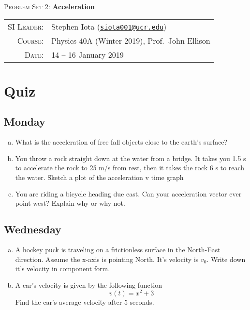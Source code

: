 \documentclass[12pt]{article}
\newcommand{\email}[1]{\texttt{\href{mailto:#1}{#1}}}
\begin{document}
\begin{center}

\Large{\textsc{Problem Set 2}: \textbf{Acceleration}}

\end{center}

\vspace{.5mm}



\begin{tabular}{rl}
\textsc{SI Leader}:
&
Stephen Iota (\email{siota001@ucr.edu})
\\
\textsc{Course}:
&
Physics 40A (Winter 2019), Prof.~John Ellison
\\
\textsc{Date}:
&
14 -- 16 January 2019
\end{tabular}



\section{Quiz}

\subsection{Monday}
\begin{enumerate}[(a)]
	\item What is the acceleration of free fall objects close to the earth's surface?
	\vspace{-1mm}
	\item You throw a rock straight down at the water from a bridge. It takes you 1.5 s to accelerate the rock to 25 m/s from rest, then it takes the rock 6 s to reach the water. Sketch a plot of the acceleration v time graph
	\vspace{-1mm}
	\item You are riding a bicycle heading due east. Can your acceleration vector ever point west? Explain why or why not.
	\vspace{-1mm}
\end{enumerate}


\subsection{Wednesday}

\begin{enumerate}[(a)]
	\item A hockey puck is traveling on a frictionless surface in the North-East direction. Assume the x-axis is pointing North. It's velocity is $v_0$. Write down it's velocity in component form.
	\vspace{-1mm}
	\item A car's velocity is given by the following function
	 		$$ v(t) = x^2 + 3 $$
          Find the car's average velocity after 5 seconds.  
          
\end{enumerate}
\end{document}

